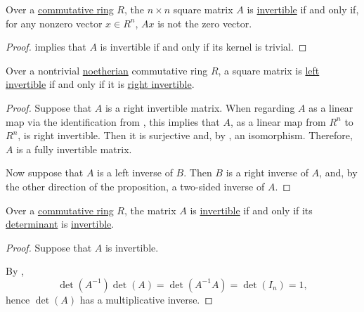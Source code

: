 \begin{proposition}\label{thm:matrix_invertibility_via_kernel}
  Over a \hyperref[def:ring/commutative]{commutative ring} \( R \), the \( n \times n \) square matrix \( A \) is \hyperref[def:inverse_matrix]{invertible} if and only if, for any nonzero vector \( x \in R^n \), \( Ax \) is not the zero vector.
\end{proposition}
\begin{proof}
   implies that \( A \) is invertible if and only if its kernel is trivial.
\end{proof}

\begin{proposition}\label{thm:square_matrix_left_invertible_iff_right_invertible}
  Over a nontrivial \hyperref[def:noetherian_semiring]{noetherian} commutative ring \( R \), a square matrix is \hyperref[def:inverse_matrix]{left invertible} if and only if it is \hyperref[def:inverse_matrix]{right invertible}.
\end{proposition}
\begin{proof}
  \NecessitySubProof Suppose that \( A \) is a right invertible matrix. When regarding \( A \) as a linear map via the identification from , this implies that \( A \), as a linear map from \( R^n \) to \( R^n \), is right invertible. Then it is surjective and, by , an isomorphism. Therefore, \( A \) is a fully invertible matrix.

  \SufficiencySubProof Now suppose that \( A \) is a left inverse of \( B \). Then \( B \) is a right inverse of \( A \), and, by the other direction of the proposition, a two-sided inverse of \( A \).
\end{proof}

\begin{proposition}\label{thm:matrix_invertibility_via_determinants}
  Over a \hyperref[def:ring/commutative]{commutative ring} \( R \), the matrix \( A \) is \hyperref[def:inverse_matrix]{invertible} if and only if its \hyperref[def:matrix_determinant]{determinant} is \hyperref[def:divisibility/invertible]{invertible}.
\end{proposition}
\begin{proof}
  \SufficiencySubProof Suppose that \( A \) is invertible.

  By ,
  \begin{equation*}
    \det(A^{-1}) \det(A) = \det(A^{-1} A) = \det(I_n) = 1,
  \end{equation*}
  hence \( \det(A) \) has a multiplicative inverse.

  \NecessitySubProof {}
\end{proof}

